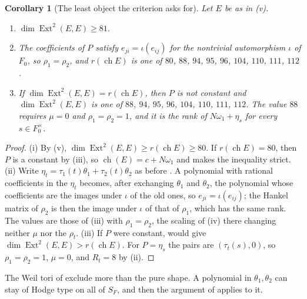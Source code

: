 \documentclass[11pt,reqno]{amsart}
\theoremstyle{plain}
\newtheorem{corollary}[theorem]{Corollary}
\theoremstyle{definition}
\theoremstyle{remark}
\DeclareMathOperator{\ch}{ch}
\DeclareMathOperator{\Ext}{Ext}
\begin{document}
\begin{corollary}[The least object the criterion asks for]
\label{cor:quarticleast}
Let $E$ be as in \textup{(v)}.
\begin{enumerate}[label=\textup{(\roman*)},leftmargin=2.6em,itemsep=2pt]
\item $\dim\Ext^{2}(E,E)\ge81$.
\item The coefficients of $P$ satisfy $e_{ji}=\iota(e_{ij})$ for the
  nontrivial automorphism $\iota$ of $F_{0}$, so $\rho_{1}=\rho_{2}$, and
  $r(\ch E)$ is one of $80$, $88$, $94$, $95$, $96$, $104$, $110$, $111$,
  $112$.
\item If $\dim\Ext^{2}(E,E)=r(\ch E)$, then $P$ is not constant and
  $\dim\Ext^{2}(E,E)$ is one of $88$, $94$, $95$, $96$, $104$, $110$, $111$,
  $112$. The value $88$ requires $\mu=0$ and $\rho_{1}=\rho_{2}=1$, and it is
  the rank of $N\omega_{1}+\eta_{s}$ for every $s\in F_{0}^{\times}$.
\end{enumerate}
\end{corollary}

\begin{proof}
(i) By (v), $\dim\Ext^{2}(E,E)\ge r(\ch E)\ge80$. If
$r(\ch E)=80$, then $P$ is a constant by (iii), so
$\ch(E)=c+N\omega_{1}$ and  makes the inequality
strict. (ii) Write $\eta_{t}=\tau_{1}(t)\theta_{1}+\tau_{2}(t)\theta_{2}$
as before . A polynomial with rational coefficients in the
$\eta_{t}$ becomes, after exchanging $\theta_{1}$ and $\theta_{2}$, the
polynomial whose coefficients are the images under $\iota$ of the old ones,
so $e_{ji}=\iota(e_{ij})$; the Hankel matrix of $\rho_{2}$ is then the image
under $\iota$ of that of $\rho_{1}$, which has the same rank. The values are
those of (iii) with $\rho_{1}=\rho_{2}$, the scaling
of (iv) there changing neither $\mu$ nor the $\rho_{t}$. (iii) If $P$ were
constant,  would give $\dim\Ext^{2}(E,E)>r(\ch E)$.
For $P=\eta_{s}$ the pairs are $(\tau_{t}(s),0)$, so $\rho_{1}=\rho_{2}=1$,
$\mu=0$, and $R_{t}=8$ by (ii).
\end{proof}

The Weil tori of  exclude more than the pure shape.
A polynomial in $\theta_{1},\theta_{2}$ can stay of Hodge type on all of
$S_{F}$, and then the argument of  applies to it.
\end{document}

